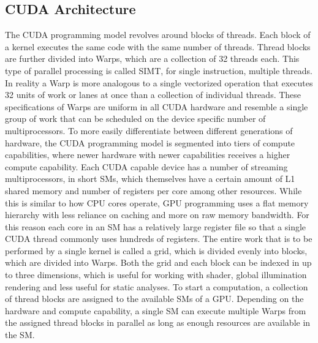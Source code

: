 \subsection{CUDA Architecture}
The CUDA programming model revolves around blocks of threads. Each block of a kernel executes the same code with the same number of threads.
Thread blocks are further divided into Warps, which are a collection of 32 threads each. This type of parallel processing is called SIMT, for single instruction, multiple threads.
In reality a Warp is more analogous to a single vectorized operation that executes 32 units of work or lanes at once than a collection of individual threads.
These specifications of Warps are uniform in all CUDA hardware and resemble a single group of work that can be scheduled on the device specific number of multiprocessors.
To more easily differentiate between different generations of hardware, the CUDA programming model is segmented into tiers of compute capabilities, where newer hardware with newer capabilities receives a higher compute capability.
Each CUDA capable device has a number of streaming multiprocessors, in short SMs, which themselves have a certain amount of L1 shared memory and number of registers per core among other resources. 
While this is similar to how CPU cores operate, GPU programming uses a flat memory hierarchy with less reliance on caching and more on raw memory bandwidth. For this reason each core in an SM has a relatively large register file so that a single CUDA thread commonly uses hundreds of registers.
The entire work that is to be performed by a single kernel is called a grid, which is divided evenly into blocks, which are divided into Warps. Both the grid and each block can be indexed in up to three dimensions, which is useful for working with shader, global illumination rendering and less useful for static analyses.
To start a computation, a collection of thread blocks are assigned to the available SMs of a GPU. Depending on the hardware and compute capability, a single SM can execute multiple Warps from the assigned thread blocks in parallel as long as enough resources are available in the SM.
